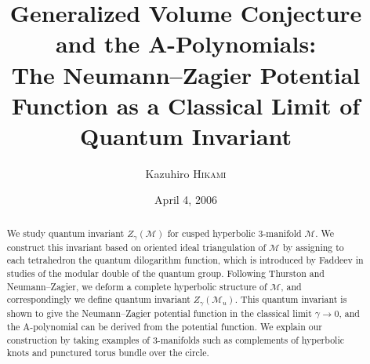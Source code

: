 \documentclass[12pt,reqno]{amsart}
\numberwithin{equation}{section}
\begin{document}



\baselineskip 16pt
\parskip 8pt





\title[Generalized Volume Conjecture \& the A-polynomials]{
  Generalized Volume Conjecture
  and the A-Polynomials:
  \\
  The Neumann--Zagier Potential Function
  as a Classical Limit of Quantum Invariant
}



\author[K. Hikami]{Kazuhiro \textsc{Hikami}}
\date{April 4, 2006}

\address{Department of Physics, Graduate School of Science,\\
  University of Tokyo,\\
  Hongo 7--3--1, Bunkyo, Tokyo 113--0033, Japan.
}
















\begin{abstract}
  We study quantum invariant
  $Z_\gamma(\mathcal{M})$ for cusped
  hyperbolic 3-manifold $\mathcal{M}$.
  We construct this  invariant based on oriented
  ideal
  triangulation of $\mathcal{M}$ by assigning   to each tetrahedron
  the quantum dilogarithm
  function, which is introduced by Faddeev in studies of the modular
  double of the quantum group.
  Following Thurston and Neumann--Zagier, we deform a complete hyperbolic
  structure of $\mathcal{M}$,
  and correspondingly we  define  quantum
  invariant $Z_\gamma(\mathcal{M}_u)$.
  This quantum invariant is shown to give
  the Neumann--Zagier
  potential function
  in the classical limit
  $\gamma\to 0$,
  and the A-polynomial can be derived from the potential function.
  We explain our construction by
  taking  examples of 3-manifolds such as complements of
  hyperbolic knots and punctured torus bundle over the circle.
\end{abstract}
\end{document}

